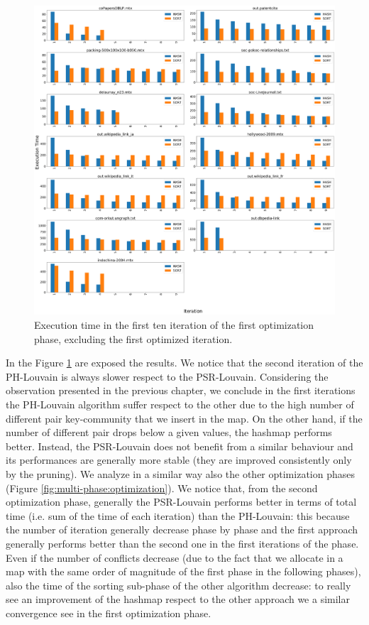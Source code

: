 \begin{figure}[t!]
	\centering
	\includegraphics[width=1\linewidth]{0-resources/hash-vs-sort}
	\caption{Execution time in the first ten iteration of the first optimization phase, excluding the first optimized iteration.}
	\label{fig:hash-vs-sort}
\end{figure}
In the Figure \ref{fig:hash-vs-sort} are exposed the results. We notice that the second iteration of the PH-Louvain is always slower respect to the PSR-Louvain.
Considering the observation presented in the previous chapter, we conclude in the first iterations the PH-Louvain algorithm suffer respect to the other due to the high number of different pair key-community that we insert in the map. 
On the other hand, if the number of different pair drops below a given values, the hashmap performs better.
Instead, the PSR-Louvain does not benefit from a similar behaviour and its performances are generally more stable (they are improved consistently only by the pruning). 
We analyze in a similar way also the other optimization phases (Figure \ref{fig:multi-phase:optimization}). 
We notice that, from the second optimization phase, generally the PSR-Louvain performs better in terms of total time (i.e. sum of the time of each iteration) than the PH-Louvain: this because the number of iteration generally decrease phase by phase and the first approach generally performs better than the second one in the first iterations of the phase. Even if the number of conflicts decrease (due to the fact that we allocate in a map with the same order of magnitude of the first phase in the following phases), also the time of the sorting sub-phase of the other algorithm decrease: to really see an improvement of the hashmap respect to the other approach we a similar convergence see in the first optimization phase.
